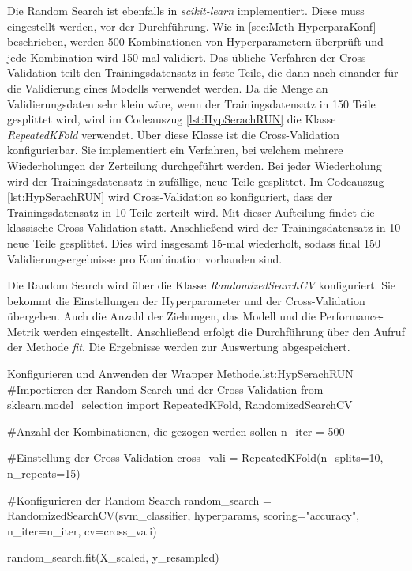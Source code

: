 Die Random Search ist ebenfalls in \textit{scikit-learn} implementiert. Diese muss eingestellt werden, vor der Durchführung. Wie in \ref{sec:Meth HyperparaKonf} beschrieben, werden 500 Kombinationen von Hyperparametern überprüft und jede Kombination wird 150-mal validiert. Das übliche Verfahren der Cross-Validation teilt den Trainingsdatensatz in feste Teile, die dann nach einander für die Validierung eines Modells verwendet werden. Da die Menge an Validierungsdaten sehr klein wäre, wenn der Trainingsdatensatz in 150 Teile gesplittet wird, wird im Codeauszug \ref{lst:HypSerachRUN} die Klasse \textit{RepeatedKFold} verwendet. Über diese Klasse ist die Cross-Validation konfigurierbar. Sie implementiert ein Verfahren, bei welchem mehrere Wiederholungen der Zerteilung durchgeführt werden. Bei jeder Wiederholung wird der Trainingsdatensatz in zufällige, neue Teile gesplittet. Im Codeauszug \ref{lst:HypSerachRUN} wird Cross-Validation so konfiguriert, dass der Trainingsdatensatz in 10 Teile zerteilt wird. Mit dieser Aufteilung findet die klassische Cross-Validation statt. Anschließend wird der Trainingsdatensatz in 10 neue Teile gesplittet. Dies wird insgesamt 15-mal wiederholt, sodass final 150 Validierungsergebnisse pro Kombination vorhanden sind. \par

Die Random Search wird über die Klasse \textit{RandomizedSearchCV} konfiguriert. Sie bekommt die Einstellungen der Hyperparameter und der Cross-Validation übergeben. Auch die Anzahl der Ziehungen, das Modell und die Performance-Metrik werden eingestellt. Anschließend erfolgt die Durchführung über den Aufruf der Methode \textit{fit}. Die Ergebnisse werden zur Auswertung abgespeichert.

\begin{pythoncode}{Konfigurieren und Anwenden der Wrapper Methode.}{lst:HypSerachRUN}
#Importieren der Random Search und der Cross-Validation
from sklearn.model_selection import RepeatedKFold, RandomizedSearchCV

#Anzahl der Kombinationen, die gezogen werden sollen
n_iter = 500

#Einstellung der Cross-Validation
cross_vali = RepeatedKFold(n_splits=10, n_repeats=15)

#Konfigurieren der Random Search 
random_search = RandomizedSearchCV(svm_classifier, 
                                   hyperparams, 
                                   scoring="accuracy", 
                                   n_iter=n_iter, 
                                   cv=cross_vali)

random_search.fit(X_scaled, y_resampled)
\end{pythoncode}



